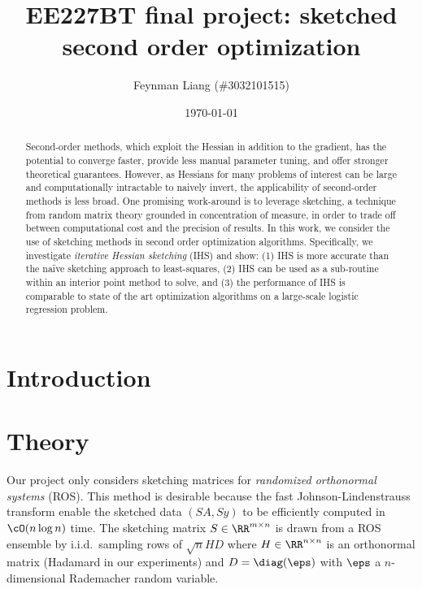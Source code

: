 \documentclass[12pt,letterpaper,boxed]{article}
\begin{document}
\title{EE227BT final project: sketched second order optimization}
\author{Feynman Liang (\#3032101515)}
\date{\today}

\maketitle

\begin{abstract}
  Second-order methods, which exploit the Hessian in addition to the gradient,
  has the potential to converge faster, provide less manual parameter tuning,
  and offer stronger theoretical guarantees. However, as Hessians for many problems
  of interest can be large and computationally intractable to naively invert,
  the applicability of second-order methods is less broad.
  One promising work-around is to leverage sketching, a technique from
  random matrix theory grounded in concentration of measure, in order to
  trade off between computational cost and the precision of results.
  In this work, we consider the use of sketching methods in second order
  optimization algorithms.
  Specifically, we investigate \emph{iterative Hessian sketching} (IHS) \cite{pilanci2016iterative}
  and show: (1) IHS is more accurate than the na\"ive sketching approach to least-squares,
  (2) IHS can be used as a sub-routine within an interior point method to solve,
  and (3) the performance of IHS is comparable to state of the art optimization algorithms
  on a large-scale logistic regression problem.
\end{abstract}

\section{Introduction}

\section{Theory}

Our project only considers sketching matrices for \emph{randomized orthonormal systems} (ROS).
This method is desirable because the fast Johnson-Lindenstrauss transform \cite{ailon2009fast} enable the
sketched data $(S A, S y)$ to be efficiently computed in $\cO(n \log n)$ time.
The sketching matrix $S \in \RR^{m \times n}$ is drawn from a ROS ensemble by i.i.d.\ sampling
rows of $\sqrt{n} H D$ where $H \in \RR^{n \times n}$ is an orthonormal matrix (Hadamard
in our experiments) and $D = \diag(\eps)$ with $\eps$ a $n$-dimensional Rademacher random variable.
\end{document}
